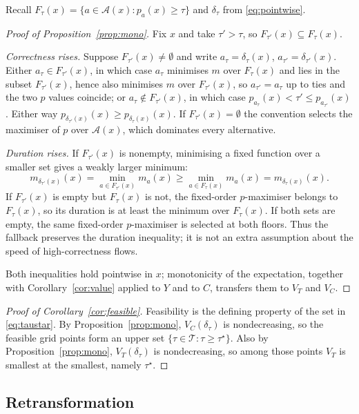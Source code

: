 \documentclass[11pt,a4paper]{article}
\theoremstyle{plain}
\theoremstyle{definition}
\theoremstyle{remark}
\begin{document}
Recall $F_\tau(x)=\{a\in\mathcal A(x):p_a(x)\ge\tau\}$ and $\delta_\tau$ from
\eqref{eq:pointwise}.

\begin{proof}[Proof of Proposition~\ref{prop:mono}]
Fix $x$ and take $\tau'>\tau$, so $F_{\tau'}(x)\subseteq F_\tau(x)$.

\emph{Correctness rises.} Suppose $F_{\tau'}(x)\ne\emptyset$ and write $a_\tau=\delta_\tau(x)$,
$a_{\tau'}=\delta_{\tau'}(x)$. Either $a_\tau\in F_{\tau'}(x)$, in which case $a_\tau$ minimises
$m$ over $F_\tau(x)$ and lies in the subset $F_{\tau'}(x)$, hence also minimises $m$ over
$F_{\tau'}(x)$, so $a_{\tau'}=a_\tau$ up to ties and the two $p$ values coincide; or
$a_\tau\notin F_{\tau'}(x)$, in which case $p_{a_\tau}(x)<\tau'\le p_{a_{\tau'}}(x)$. Either way
$p_{\delta_{\tau'}(x)}(x)\ge p_{\delta_\tau(x)}(x)$. If $F_{\tau'}(x)=\emptyset$ the convention
selects the maximiser of $p$ over $\mathcal A(x)$, which dominates every alternative.

\emph{Duration rises.} If $F_{\tau'}(x)$ is nonempty, minimising a fixed function over a
smaller set gives a weakly larger minimum:
\[
m_{\delta_{\tau'}(x)}(x)
=\min_{a\in F_{\tau'}(x)}m_a(x)
\ge \min_{a\in F_\tau(x)}m_a(x)
=m_{\delta_\tau(x)}(x).
\]
If $F_{\tau'}(x)$ is empty but $F_\tau(x)$ is not, the fixed-order $p$-maximiser belongs to
$F_\tau(x)$, so its duration is at least the minimum over $F_\tau(x)$. If both sets are empty,
the same fixed-order $p$-maximiser is selected at both floors. Thus the fallback preserves the
duration inequality; it is not an extra assumption about the speed of high-correctness flows.

Both inequalities hold pointwise in $x$; monotonicity of the expectation, together with
Corollary~\ref{cor:value} applied to $Y$ and to $C$, transfers them to $V_T$ and $V_C$.
\end{proof}

\begin{proof}[Proof of Corollary~\ref{cor:feasible}]
Feasibility is the defining property of the set in \eqref{eq:taustar}. By
Proposition~\ref{prop:mono}, $V_C(\delta_\tau)$ is nondecreasing, so the feasible grid points
form an upper set $\{\tau\in\mathcal T:\tau\ge\tau^\star\}$. Also by
Proposition~\ref{prop:mono}, $V_T(\delta_\tau)$ is nondecreasing, so among those points $V_T$ is
smallest at the smallest, namely $\tau^\star$.
\end{proof}

\subsection{Retransformation}
\end{document}
